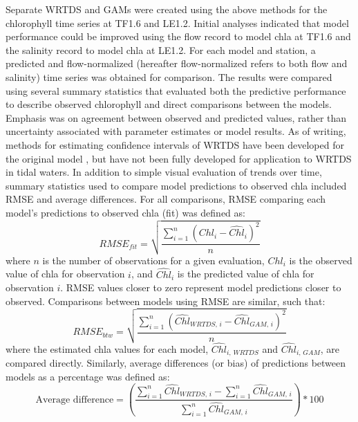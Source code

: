 \documentclass[letterpaper,12pt,oneside]{article}\usepackage[]{graphicx}\usepackage[]{color}
\begin{document}
Separate \ac{WRTDS} and \acp{GAM} were created using the above methods for the chlorophyll time series at TF1.6 and LE1.2.  Initial analyses indicated that model performance could be improved using the flow record to model \ac{chla} at TF1.6 and the salinity record to model \ac{chla} at LE1.2.  For each model and station, a predicted and flow-normalized (hereafter flow-normalized refers to both flow and salinity) time series was obtained for comparison.  The results were compared using several summary statistics that evaluated both the predictive performance to describe observed chlorophyll and direct comparisons between the models.  Emphasis was on agreement between observed and predicted values, rather than uncertainty associated with parameter estimates or model results.  As of writing, methods for estimating confidence intervals of \ac{WRTDS} have been developed for the original model \citep{Hirsch15}, but have not been fully developed for application to \ac{WRTDS} in tidal waters.  In addition to simple visual evaluation of trends over time, summary statistics used to compare model predictions to observed \ac{chla} included \ac{RMSE} and average differences.  For all comparisons, \ac{RMSE} comparing each model's predictions to observed \ac{chla} (fit) was defined as:
\begin{equation}
RMSE_{fit} = \sqrt {\frac{{\sum\limits_{{i = 1}}^n {{{\left( {{Chl_i} - {\widehat{Chl}_i}} \right)}^2}} }}{n}}
\end{equation}
where $n$ is the number of observations for a given evaluation, $Chl_i$ is the observed value of \ac{chla} for observation $i$, and ${\widehat{Chl}}_i$ is the predicted value of \ac{chla} for observation $i$.  \ac{RMSE} values closer to zero represent model predictions closer to observed.  Comparisons between models using \ac{RMSE} are similar, such that:
\begin{equation} \label{rmse_fun}
RMSE_{btw} = \sqrt {\frac{{\sum\limits_{{i = 1}}^n {{{\left( {{\widehat{Chl}_{WRTDS,\,i}} - {{\widehat{Chl}}_{GAM,\,i}}} \right)}^2}} }}{n}}
\end{equation}
where the estimated \ac{chla} values for each model, $\widehat{Chl}_{i,\,WRTDS}$ and $\widehat{Chl}_{i,\,GAM}$, are compared directly.  Similarly, average differences (or bias) of predictions between models as a percentage was defined as:
\begin{equation} \label{avediff_fun}
\textrm{Average difference} = \left(\frac{\sum\limits_{i = 1}^n \widehat{Chl}_{WRTDS,\,i} - \sum\limits_{i = 1}^n \widehat{Chl}_{GAM,\,i}}{\sum\limits_{i = 1}^n \widehat{Chl}_{GAM,\,i}}\right) * 100
\end{equation}
\end{document}
